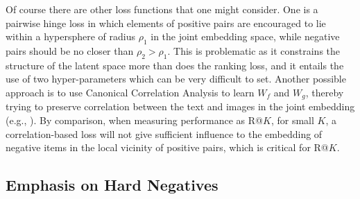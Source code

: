 Of course there are other loss functions that one might consider.
One  is a pairwise hinge loss in which elements of positive pairs
are encouraged to lie within a hypersphere of radius $\rho_1$ in 
the joint embedding space,
while negative pairs should be no closer than $\rho_2 > \rho_1$.
This is problematic as it constrains the structure of the latent space more 
than does the ranking loss, and it entails the use of two hyper-parameters 
which can be very difficult to set.
Another possible approach is to use Canonical Correlation Analysis to learn 
$W_f$ and $W_g$, thereby trying to preserve correlation between the text and 
images in the joint embedding (e.g., 
\cite{klein2015associating,eisenschtat2016linking}).  By comparison, when 
measuring performance as R@$K$, for small $K$, a correlation-based loss will 
not give sufficient influence to the embedding of negative items in the local 
vicinity of positive pairs, which is critical for R@$K$.  

\subsection{Emphasis on Hard Negatives}
\label{sec:hard_neg}

